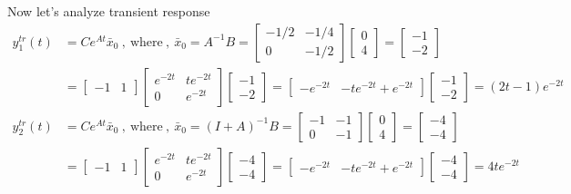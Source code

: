 \documentclass[twoside]{article}
\begin{document}
Now let's analyze transient response
\begin{align*} 
y_1^{tr}(t) &= C e^{A t} \bar{x}_0 \ , \ \mathrm{where} \ , \  \bar{x}_0 = A^{-1} B = \begin{bmatrix} -1/2 & -1/4 \\ 0 & -1/2 \end{bmatrix}  \begin{bmatrix} 0 \\ 4 \end{bmatrix} = \begin{bmatrix} -1 \\ -2 \end{bmatrix} 
\\[1ex]
&= \begin{bmatrix} -1 & 1 \end{bmatrix} \begin{bmatrix} e^{-2 t} & t e^{-2 t} \\ 0 &e^{-2 t} \end{bmatrix} \begin{bmatrix} -1 \\ -2 \end{bmatrix} 
= \begin{bmatrix} -e^{-2 t} & -t e^{-2 t} + e^{-2 t} \end{bmatrix} \begin{bmatrix} -1 \\ -2 \end{bmatrix}  
= (2 t - 1) e^{-2 t} 
\\[1ex]
y_2^{tr}(t) &= C e^{A t} \bar{x}_0 \ , \ \mathrm{where} \ , \  \bar{x}_0 = (I+A)^{-1} B = \begin{bmatrix} -1 & -1 \\ 0 & -1 \end{bmatrix}  \begin{bmatrix} 0 \\ 4 \end{bmatrix} = \begin{bmatrix} -4 \\ -4 \end{bmatrix} 
\\[1ex]
&= \begin{bmatrix} -1 & 1 \end{bmatrix} \begin{bmatrix} e^{-2 t} & t e^{-2 t} \\ 0 &e^{-2 t} \end{bmatrix} \begin{bmatrix} -4 \\ -4 \end{bmatrix} 
= \begin{bmatrix} -e^{-2 t} & -t e^{-2 t} + e^{-2 t} \end{bmatrix} \begin{bmatrix} -4 \\ -4 \end{bmatrix}  
= 4 t e^{-2 t} 
\end{align*}
\end{document}
